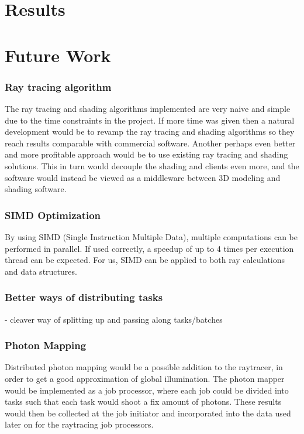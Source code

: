 \chapter{Results}

\chapter{Future Work}
\subsection{Ray tracing algorithm}
The ray tracing and shading algorithms implemented are very naive and simple due to the time constraints in the project. If more time was given then a natural development would be to revamp the ray tracing and shading algorithms so they reach results comparable with commercial software. Another perhaps even better and more profitable approach would be to use existing ray tracing and shading solutions. This in turn would decouple the shading and clients even more, and the software would instead be viewed as a middleware between 3D modeling and shading software.

\subsection{SIMD Optimization}
By using SIMD (Single Instruction Multiple Data), multiple computations can be performed in parallel. If used correctly, a speedup of up to 4 times per execution thread can be expected. For us, SIMD can be applied to both ray calculations and data structures.

\subsection{Better ways of distributing tasks}
- cleaver way of splitting up and passing along tasks/batches\\

\subsection{Photon Mapping}
Distributed photon mapping would be a possible addition to the raytracer, in order to get a good approximation of global illumination. The photon mapper would be implemented as a job processor, where each job could be divided into tasks such that each task would shoot a fix amount of photons. These results would then be collected at the job initiator and incorporated into the data used later on for the raytracing job processors.

